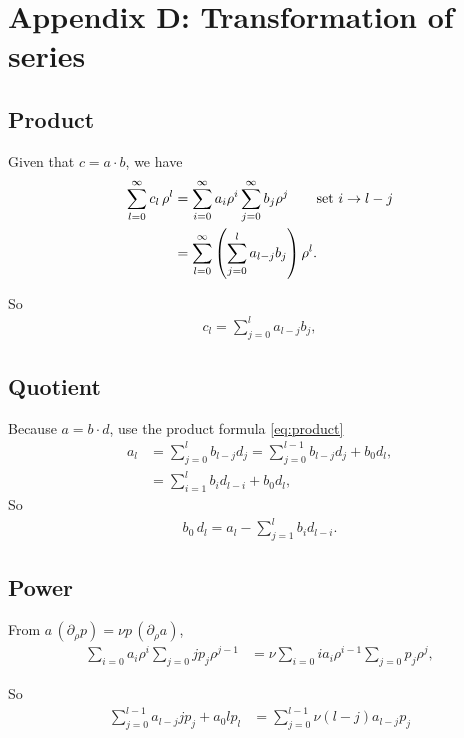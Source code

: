 \documentclass[aip,jcp,reprint,superscriptaddress]{revtex4-1}
\numberwithin{equation}{subsection}
\begin{document}
\section{Appendix D: Transformation of series}

\subsection{Product}

Given that $c = a \cdot b$, we have
\begin{align*}
  \sum_{l = 0}^{\infty} c_l \, \rho^l
  &=
  \sum_{i = 0}^{\infty} a_i \rho^i
  \sum_{j = 0}^{\infty} b_j \rho^j
  \qquad \mbox{set $i \rightarrow l - j$}
 \notag \\
  &=
  \sum_{l = 0}^{\infty}
  \left(
  \sum_{j = 0}^{l}
    a_{l-j} b_j \right) \rho^l.
\end{align*}

So
\begin{align}
  c_l = \sum_{j = 0}^{l} a_{l-j} b_j,
  \label{eq:product}
\end{align}



\subsection{Quotient}


Because $a = b \cdot d$,
use the product formula \eqref{eq:product}
\begin{align*}
  a_l
  &= \sum_{j = 0}^{l} b_{l-j} d_j
  = \sum_{j = 0}^{l - 1} b_{l - j} d_j + b_0 d_l,
\\
  &= \sum_{i = 1}^{l} b_{i} d_{l - i} + b_0 d_l,
\end{align*}
So
\begin{align*}
  b_0 \, d_l = a_l -\sum_{j = 1}^{l} b_{i} d_{l - i}.
\end{align*}


\subsection{Power}

From $a \, (\partial_\rho p) = \nu p \, (\partial_\rho a)$,
%
\begin{align*}
  \sum_{i = 0} a_i \rho^i
  \sum_{j = 0} j p_j \rho^{j - 1}
&=
  \nu
  \sum_{i = 0} i a_i \rho^{i - 1}
  \sum_{j = 0} p_j \rho^{j},
\end{align*}

So
\begin{align*}
  \sum_{j = 0}^{l-1} a_{l-j} j p_j + a_0 l p_l
&=
  \sum_{j = 0}^{l-1} \nu (l - j) a_{l - j} p_j
\end{align*}
\end{document}
